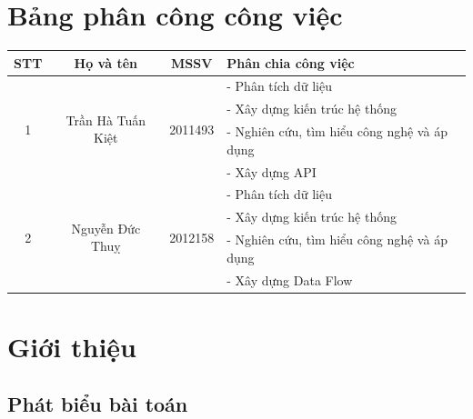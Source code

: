 \documentclass[12pt, a4paper]{report}
\theoremstyle{definition}
\begin{document}
\chapter*{Bảng phân công công việc}
\begin{table}[H]
    \centering
    \renewcommand{\arraystretch}{1.5}
    \begin{tabular}{|c|c|c|l|}
        \hline
        \textbf{STT}       & \textbf{Họ và tên}                 & \textbf{MSSV}            & \textbf{Phân chia công việc}                \\
        \hline
        \multirow{4}{*}{1} & \multirow{4}{*}{Trần Hà Tuấn Kiệt} & \multirow{4}{*}{2011493} & - Phân tích dữ liệu                         \\
                           &                                    &                          & - Xây dựng kiến trúc hệ thống               \\
                           &                                    &                          & - Nghiên cứu, tìm hiểu công nghệ và áp dụng \\
                           &                                    &                          & - Xây dựng API                              \\
        \hline
        \multirow{4}{*}{2} & \multirow{4}{*}{Nguyễn Đức Thuỵ}   & \multirow{4}{*}{2012158} & - Phân tích dữ liệu                         \\
                           &                                    &                          & - Xây dựng kiến trúc hệ thống               \\
                           &                                    &                          & - Nghiên cứu, tìm hiểu công nghệ và áp dụng \\
                           &                                    &                          & - Xây dựng Data Flow                        \\
        \hline
    \end{tabular}
\end{table}
\newpage
\tableofcontents
\newpage
\listoffigures
\listoftables
\chapter{Giới thiệu}
\section{Phát biểu bài toán}

\end{document}
